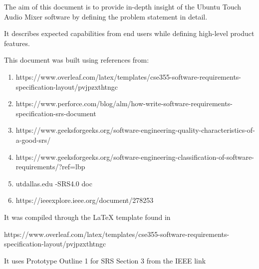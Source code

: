 
\label{ch:intro}
The aim of this document is to provide in-depth insight of the Ubuntu Touch Audio Mixer software by defining the problem statement in detail. 

It describes expected capabilities from end users while defining high-level product features.


This document was built using references from:


\begin{enumerate}
\item https://www.overleaf.com/latex/templates/cse355-software-requirements-specification-layout/pvjpzxthtngc
\item https://www.perforce.com/blog/alm/how-write-software-requirements-specification-srs-document
\item https://www.geeksforgeeks.org/software-engineering-quality-characteristics-of-a-good-srs/
\item https://www.geeksforgeeks.org/software-engineering-classification-of-software-requirements/?ref=lbp
\item utdallas.edu -SRS4.0 doc
\item https://ieeexplore.ieee.org/document/278253
\end{enumerate}


It was compiled through the LaTeX template found in 

https://www.overleaf.com/latex/templates/cse355-software-requirements-specification-layout/pvjpzxthtngc


It uses Prototype Outline 1 for SRS Section 3 from the IEEE link